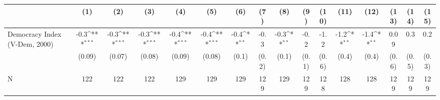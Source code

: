 {
\def\sym#1{\ifmmode^{#1}\else\(^{#1}\)\fi}
\begin{tabular}{l*{15}{c}}
\hline\hline
                    &\multicolumn{1}{c}{(1)}         &\multicolumn{1}{c}{(2)}         &\multicolumn{1}{c}{(3)}         &\multicolumn{1}{c}{(4)}         &\multicolumn{1}{c}{(5)}         &\multicolumn{1}{c}{(6)}         &\multicolumn{1}{c}{(7)}         &\multicolumn{1}{c}{(8)}         &\multicolumn{1}{c}{(9)}         &\multicolumn{1}{c}{(10)}         &\multicolumn{1}{c}{(11)}         &\multicolumn{1}{c}{(12)}         &\multicolumn{1}{c}{(13)}         &\multicolumn{1}{c}{(14)}         &\multicolumn{1}{c}{(15)}         \\
\hline
Democracy Index (V-Dem, 2000)&        -0.3\sym{***}&        -0.3\sym{***}&        -0.3\sym{***}&        -0.4\sym{***}&        -0.4\sym{***}&        -0.4\sym{**} &        -0.3         &        -0.3\sym{**} &        -0.2         &        -1.2         &        -1.2\sym{**} &        -1.4\sym{**} &        0.09         &         0.3         &         0.2         \\
                    &      (0.09)         &      (0.07)         &      (0.08)         &      (0.09)         &      (0.08)         &       (0.1)         &       (0.2)         &       (0.1)         &       (0.1)         &       (0.6)         &       (0.4)         &       (0.4)         &       (0.6)         &       (0.5)         &       (0.3)         \\
\hline
N                   &         122         &         122         &         122         &         129         &         129         &         129         &         129         &         129         &         129         &         128         &         128         &         128         &         129         &         129         &         129         \\
\hline\hline
\end{tabular}
}
